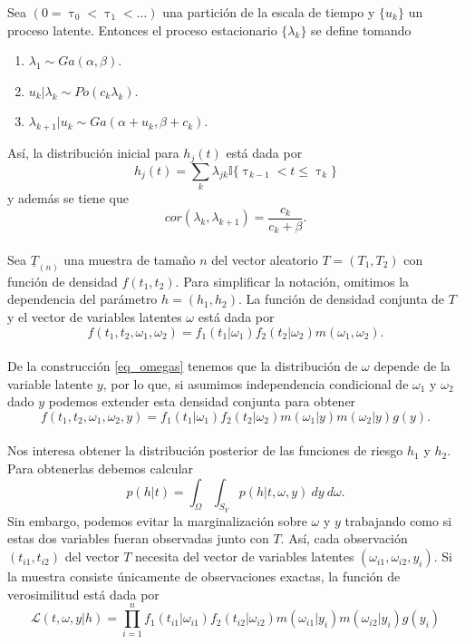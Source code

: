 \documentclass[11pt,a4paper]{article}
\begin{document}
Sea $(0 = \uptau_0 < \uptau_1 < \dots)$ una partición de la escala de tiempo  y $\lbrace u_k \rbrace$ un proceso latente. Entonces el proceso estacionario $\lbrace \lambda_k \rbrace$ se define tomando

\begin{enumerate}
\item $\lambda_1 \sim Ga(\alpha, \beta).$
\item $u_k | \lambda_k \sim Po(c_k\lambda_k).$
\item $\lambda_{k+1}|u_k \sim Ga(\alpha + u_k, \beta + c_k).$\\
\end{enumerate}

Así, la distribución inicial para $h_j(t)$ está dada por $$h_j(t) = \sum_k \lambda_{jk} \mathbb{I}\lbrace \uptau_{k-1} < t \leq \uptau_{k} \rbrace$$ y además se tiene que $$cor(\lambda_k, \lambda_{k+1}) = \frac{c_k}{c_k + \beta}.$$\\

Sea $\underline{T}_{(n)}$ una muestra de tamaño $n$ del vector aleatorio $T=(T_1, T_2)$ con función de densidad $f(t_1, t_2)$. Para simplificar la notación, omitimos la dependencia del parámetro $h = (h_1, h_2).$ La función de densidad conjunta de $T$ y el vector de variables latentes $\omega$ está dada por $$f(t_1, t_2, \omega_1, \omega_2) = f_1(t_1|\omega_1)f_2(t_2|\omega_2)m(\omega_1, \omega_2).$$\\

De la construcción \eqref{eq_omegas} tenemos que la distribución de $\omega$ depende de la variable latente $y$, por lo que, si asumimos independencia condicional de $\omega_1$ y $\omega_2$ dado $y$ podemos extender esta densidad conjunta para obtener
$$f(t_1, t_2, \omega_1, \omega_2, y)= f_1(t_1|\omega_1)f_2(t_2|\omega_2)m(\omega_1|y)m(\omega_2|y)g(y).$$\\

Nos interesa obtener la distribución posterior de las funciones de riesgo $h_1$ y $h_2$. Para obtenerlas debemos calcular $$p(h | t) = \int_{\Omega} \int_{S_Y} p(h | t, \omega, y) \ dy \ d\omega.$$ Sin embargo, podemos evitar la marginalización sobre $\omega$ y $y$ trabajando como si estas dos variables fueran observadas junto con $T$. Así, cada observación $(t_{i1}, t_{i2})$ del vector $T$ necesita del vector de variables latentes $(\omega_{i1}, \omega_{i2}, y_i)$. Si la muestra consiste únicamente de observaciones exactas, la función de verosimilitud está dada por 
$$\mathcal{L}(t, \omega, y | h) = \prod_{i=1}^n f_1(t_{i1}|\omega_{i1})f_2(t_{i2}|\omega_{i2})m(\omega_{i1}|y_i)m(\omega_{i2}|y_i)g(y_i)$$\\
\end{document}
